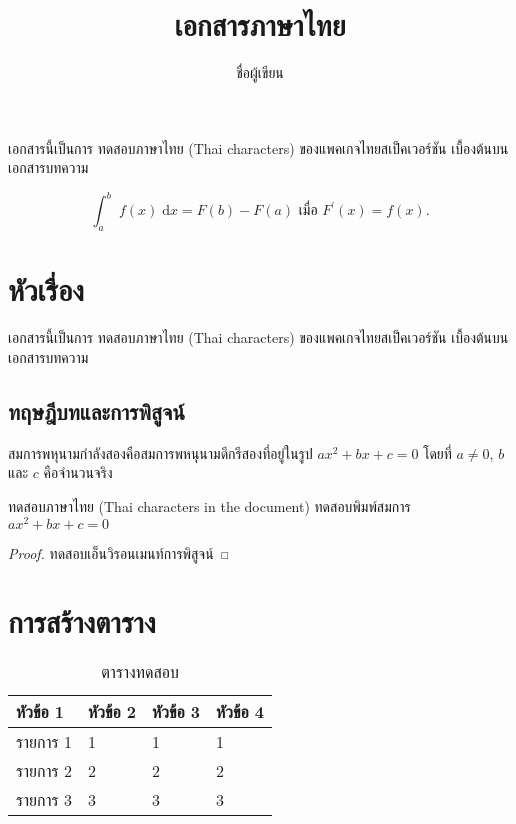 \documentclass{article}
\title{เอกสารภาษาไทย}
\author{ชื่อผู้เขียน}
\begin{document}
\maketitle

เอกสารนี้เป็นการ
ทดสอบภาษาไทย (Thai characters) ของแพคเกจไทยสเป็คเวอร์ชัน \thaispecver เบื้องต้นบนเอกสารบทความ

\[
\int_a^b\; f(x) \;\mathrm{d}x = F(b) - F(a) \text{ เมื่อ } F^{\prime}(x) = f(x).
\]

\section{หัวเรื่อง}

เอกสารนี้เป็นการ
ทดสอบภาษาไทย (Thai characters) ของแพคเกจไทยสเป็คเวอร์ชัน \thaispecver เบื้องต้นบนเอกสารบทความ

\subsection{ทฤษฎีบทและการพิสูจน์}

\begin{definition}
สมการพหุนามกำลังสองคือสมการพหนุนามดีกรีสองที่อยู่ในรูป $ax^2+bx+c = 0$ โดยที่ $a \neq 0$, $b$ และ $c$ คือจำนวนจริง
\end{definition}

\begin{theorem}
ทดสอบภาษาไทย (Thai characters in the document) ทดสอบพิมพ์สมการ $ax^2+bx+c = 0$
\end{theorem}
\begin{proof}
    ทดสอบเอ็นวิรอนเมนท์การพิสูจน์
\end{proof}

\section{การสร้างตาราง}

\begin{table}
\centering
\begin{tabular}{llll}
\hline
หัวข้อ 1 & หัวข้อ 2  & หัวข้อ 3 & หัวข้อ 4\\
\hline
รายการ 1 & 1 & 1 & 1 \\ 
รายการ 2 & 2 & 2 & 2 \\  
รายการ 3 & 3 & 3 & 3 \\ 
\hline  
\end{tabular}
\caption{ตารางทดสอบ}    
\end{table}
\end{document}
